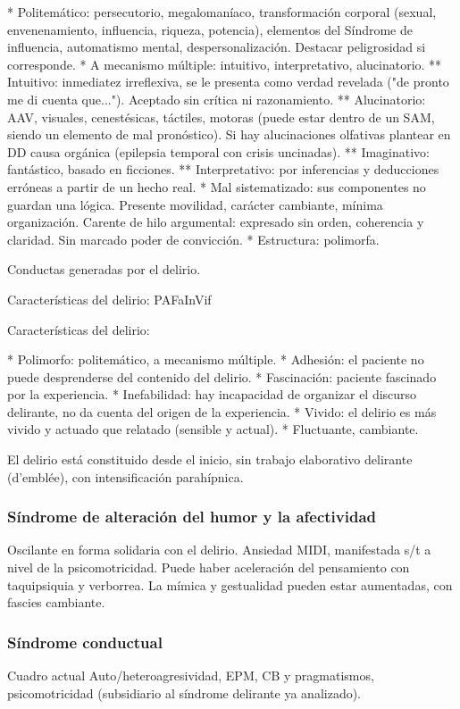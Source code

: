 * Politemático: persecutorio, megalomaníaco, transformación corporal (sexual, envenenamiento, influencia, riqueza, potencia), elementos del Síndrome de influencia, automatismo mental, despersonalización. Destacar peligrosidad si corresponde.
* A mecanismo múltiple: intuitivo, interpretativo, alucinatorio.
** Intuitivo: inmediatez irreflexiva, se le presenta como verdad revelada ("de pronto me di cuenta que..."). Aceptado sin crítica ni razonamiento.
** Alucinatorio: AAV, visuales, cenestésicas, táctiles, motoras (puede estar dentro de un SAM, siendo un elemento de mal pronóstico). Si hay alucinaciones olfativas plantear en DD causa orgánica (epilepsia temporal con crisis uncinadas).
** Imaginativo: fantástico, basado en ficciones.
** Interpretativo: por inferencias y deducciones erróneas a partir de un hecho real.
* Mal sistematizado: sus componentes no guardan una lógica. Presente movilidad, carácter cambiante, mínima organización. Carente de hilo argumental: expresado sin orden, coherencia y claridad. Sin marcado poder de convicción.
* Estructura: polimorfa.

Conductas generadas por el delirio.

\faLightbulb Características del delirio: PAFaInVif

Características del delirio:

* Polimorfo: politemático, a mecanismo múltiple.
* Adhesión: el paciente no puede desprenderse del contenido del delirio.
* Fascinación: paciente fascinado por la experiencia.
* Inefabilidad: hay incapacidad de organizar el discurso delirante, no da cuenta del origen de la experiencia.
* Vivido: el delirio es más vivido y actuado que relatado (sensible y actual).
* Fluctuante, cambiante.

El delirio está constituido desde el inicio, sin trabajo elaborativo delirante (d'emblée), con intensificación parahípnica.

\subsubsection*{Síndrome de alteración del humor y la afectividad}
Oscilante en forma solidaria con el delirio. Ansiedad MIDI, manifestada s/t a nivel de la psicomotricidad. Puede haber aceleración del pensamiento con taquipsiquia y verborrea. La mímica y gestualidad pueden estar aumentadas, con fascies cambiante.
\subsubsection*{Síndrome conductual}
Cuadro actual Auto/heteroagresividad, EPM, CB y pragmatismos, psicomotricidad (subsidiario al síndrome delirante ya analizado).

